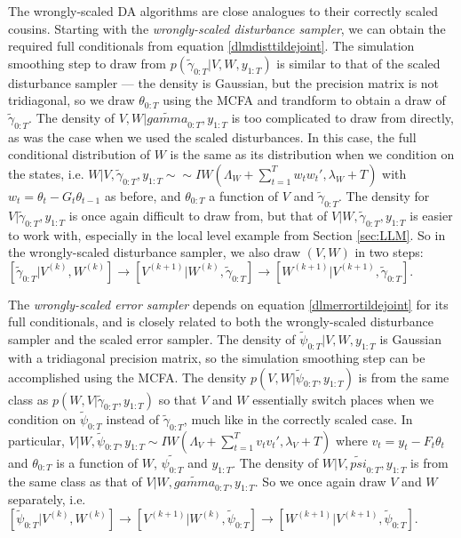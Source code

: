 \documentclass{article}
\begin{document}
The wrongly-scaled DA algorithms are close analogues to their correctly scaled cousins. Starting with the {\it wrongly-scaled disturbance sampler}, we can obtain the required full conditionals from equation \eqref{dlmdisttildejoint}. The simulation smoothing step to draw from $p(\tilde{\gamma}_{0:T}|V,W,y_{1:T})$ is similar to that of the scaled disturbance sampler --- the density is Gaussian, but the precision matrix is not tridiagonal, so we draw $\theta_{0:T}$ using the MCFA and trandform to obtain a draw of $\tilde{\gamma}_{0:T}$. The density of $V,W|\tilde{gamma}_{0:T},y_{1:T}$ is too complicated to draw from directly, as was the case when we used the scaled disturbances. In this case, the full conditional distribution of $W$ is the same as its distribution when we condition on the states, i.e. $W|V,\tilde{\gamma}_{0:T},y_{1:T} \sim \sim IW\left(\Lambda_W + \sum_{t=1}^Tw_tw_t',\lambda_{W} + T\right)$ with $w_t = \theta_t - G_t\theta_{t-1}$ as before, and $\theta_{0:T}$ a function of $V$ and $\tilde{\gamma}_{0:T}$. The density for $V|\tilde{\gamma}_{0:T},y_{1:T}$ is once again difficult to draw from, but that of $V|W,\tilde{\gamma}_{0:T},y_{1:T}$ is easier to work with, especially in the local level example from Section \ref{sec:LLM}. So in the wrongly-scaled disturbance sampler, we also draw $(V,W)$ in two steps: $[\tilde{\gamma}_{0:T}|V^{(k)},W^{(k)}] \to [V^{(k+1)}|W^{(k)},\tilde{\gamma}_{0:T}] \to [W^{(k+1)}|V^{(k+1)},\tilde{\gamma}_{0:T}]$.

The {\it wrongly-scaled error sampler} depends on equation \eqref{dlmerrortildejoint} for its full conditionals, and is closely related to both the wrongly-scaled disturbance sampler and the scaled error sampler. The density of $\tilde{\psi}_{0:T}|V,W,y_{1:T}$ is Gaussian with a tridiagonal precision matrix, so the simulation smoothing step can be accomplished using the MCFA. The density $p(V,W|\tilde{\psi}_{0:T},y_{1:T})$ is from the same class as $p(W,V|\tilde{\gamma}_{0:T},y_{1:T})$ so that $V$ and $W$ essentially switch places when we condition on $\tilde{\psi}_{0:T}$ instead of $\tilde{\gamma}_{0:T}$, much like in the correctly scaled case. In particular, $V|W,\tilde{\psi}_{0:T},y_{1:T} \sim IW\left(\Lambda_V + \sum_{t=1}^Tv_tv_t',\lambda_V + T\right)$ where $v_t = y_t - F_t\theta_t$ and $\theta_{0:T}$ is a function of $W$, $\tilde{\psi_{0:T}}$ and $y_{1:T}$. The density of $W|V,\tilde{psi}_{0:T},y_{1:T}$ is from the same class as that of $V|W,\tilde{gamma}_{0:T},y_{1:T}$. So we once again draw $V$ and $W$ separately, i.e. $[\tilde{\psi}_{0:T}|V^{(k)},W^{(k)}] \to [V^{(k+1)}|W^{(k)},\tilde{\psi}_{0:T}] \to [W^{(k+1)}|V^{(k+1)},\tilde{\psi}_{0:T}]$.
\end{document}
